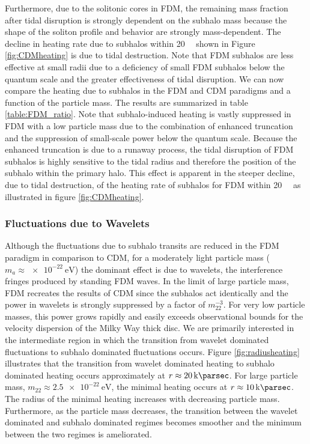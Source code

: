 \documentclass[usenatbib]{mnras}
\begin{document}
	Furthermore, due to the solitonic cores in FDM, the remaining mass fraction after tidal disruption is strongly dependent on the subhalo mass because the shape of the soliton profile and behavior are strongly mass-dependent. The decline in heating rate due to subhalos within \SI{20}{\kilo\parsec} shown in Figure \ref{fig:CDMheating} is due to tidal destruction. Note that FDM subhalos are less effective at small radii due to a deficiency of small FDM subhalos below the quantum scale and the greater effectiveness of tidal disruption. We can now compare the heating due to subhalos in the FDM and CDM paradigms and a function of the particle mass. The results are summarized in table \ref{table:FDM_ratio}. Note that subhalo-induced heating is vastly suppressed in FDM with a low particle mass due to the combination of enhanced truncation and the suppression of small-scale power below the quantum scale. Because the enhanced truncation is due to a runaway process, the tidal disruption of FDM subhalos is highly sensitive to the tidal radius and therefore the position of the subhalo within the primary halo.
This effect is apparent in the steeper decline,  due to tidal destruction, of the heating rate of subhalos for FDM within \SI{20}{\kilo\parsec} as illustrated in figure \ref{fig:CDMheating}.
 



\subsubsection{Fluctuations due to Wavelets}

Although the fluctuations due to subhalo transits are reduced in the FDM paradigm in comparison to CDM, for a moderately light particle mass ($m_a \approx \SI{e-22}{\electronvolt}$) the dominant effect is due to wavelets, the interference fringes produced by standing FDM waves. In the limit of large particle mass, FDM recreates the results of CDM since the subhalos act identically and the power in wavelets is strongly suppressed by a factor of $m_{22}^{-3}$. For very low particle masses, this power grows rapidly and easily exceeds observational bounds for the velocity dispersion of the Milky Way thick disc. We are primarily interested in the intermediate region in which the transition from wavelet dominated fluctuations to subhalo dominated fluctuations occurs. Figure \ref{fig:radiusheating} illustrates that the transition from wavelet dominated heating to subhalo dominated heating occurs approximately at $r \approx \SI{20}{\kilo \parsec}$. For large particle mass, $m_{22} \approx \SI{2.5e-22}{\electronvolt}$, the minimal heating occurs at $r \approx \SI{10}{\kilo \parsec}$. The radius of the minimal heating increases with decreasing particle mass. Furthermore, as the particle mass decreases, the transition between the wavelet dominated and subhalo dominated regimes becomes smoother and the minimum between the two regimes is ameliorated.   
\end{document}
